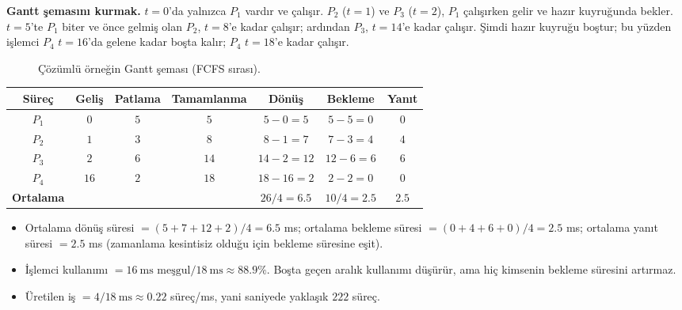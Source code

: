 \textbf{Gantt şemasını kurmak.} $t=0$'da yalnızca $P_1$ vardır ve çalışır. $P_2$ ($t=1$) ve $P_3$ ($t=2$), $P_1$ çalışırken gelir ve hazır kuyruğunda bekler. $t=5$'te $P_1$ biter ve önce gelmiş olan $P_2$, $t=8$'e kadar çalışır; ardından $P_3$, $t=14$'e kadar çalışır. Şimdi hazır kuyruğu boştur; bu yüzden işlemci $P_4$ $t=16$'da gelene kadar boşta kalır; $P_4$ $t=18$'e kadar çalışır.

\begin{figure}[H]
\centering
{}
\caption{Çözümlü örneğin Gantt şeması (FCFS sırası).}
\end{figure}

\begin{center}
\renewcommand{\arraystretch}{1.3}
\begin{tabular}{@{}ccccccc@{}}
\toprule
\textbf{Süreç} & \textbf{Geliş} & \textbf{Patlama} & \textbf{Tamamlanma} & \textbf{Dönüş} & \textbf{Bekleme} & \textbf{Yanıt} \\
\midrule
$P_1$ & $0$ & $5$ & $5$ & $5-0=5$ & $5-5=0$ & $0$ \\
$P_2$ & $1$ & $3$ & $8$ & $8-1=7$ & $7-3=4$ & $4$ \\
$P_3$ & $2$ & $6$ & $14$ & $14-2=12$ & $12-6=6$ & $6$ \\
$P_4$ & $16$ & $2$ & $18$ & $18-16=2$ & $2-2=0$ & $0$ \\
\midrule
\textbf{Ortalama} & & & & $26/4 = 6.5$ & $10/4 = 2.5$ & $2.5$ \\
\bottomrule
\end{tabular}
\end{center}

\begin{itemize}
  \item Ortalama dönüş süresi $= (5+7+12+2)/4 = 6.5$ ms; ortalama bekleme süresi $= (0+4+6+0)/4 = 2.5$ ms; ortalama yanıt süresi $= 2.5$ ms (zamanlama kesintisiz olduğu için bekleme süresine eşit).
  \item İşlemci kullanımı $= 16\ \text{ms meşgul} / 18\ \text{ms} \approx 88.9\%$. Boşta geçen aralık kullanımı düşürür, ama hiç kimsenin bekleme süresini artırmaz.
  \item Üretilen iş $= 4 / 18\ \text{ms} \approx 0.22$ süreç/ms, yani saniyede yaklaşık $222$ süreç.
\end{itemize}

